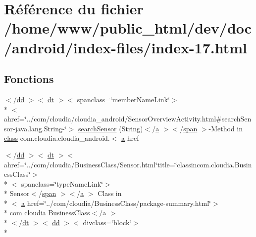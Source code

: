 \hypertarget{index-17_8html}{\section{Référence du fichier /home/www/public\-\_\-html/dev/doc/android/index-\/files/index-\/17.html}
\label{index-17_8html}
}
\subsection*{Fonctions}
\begin{DoxyCompactItemize}
\item 
$<$/\hyperlink{stylesheet_8css_a47f4718a86835a7771ec592ece845221}{dd} $>$$<$ \hyperlink{stylesheet_8css_a107565fb4039d33b041380d6e0ea1d80}{dt} $>$$<$ spanclass=\char`\"{}member\-Name\-Link\char`\"{}$>$\\*
$<$ ahref=\char`\"{}../com/cloudia/cloudia\-\_\-android/Sensor\-Overview\-Activity.\-html\#search\-Sensor-\/java.\-lang.\-String-\/\char`\"{}$>$ \hyperlink{index-17_8html_ae877ed6b9ae30d5ed6ffe780bcd142f5}{search\-Sensor} (String)$<$/\hyperlink{style_8css_a5e8981582017bb8b84c21f148345d1f7}{a} $>$$<$/\hyperlink{stylesheet_8css_a8343996ebcf16220b04e54659aac31cc}{span} $>$-\/Method in \hyperlink{_tools_8html_acf06f836132665ba8114f5a414c2403f}{class} com.\-cloudia.\-cloudia\-\_\-android.$<$ \hyperlink{style_8css_a5e8981582017bb8b84c21f148345d1f7}{a} href
\item 
$<$/\hyperlink{stylesheet_8css_a47f4718a86835a7771ec592ece845221}{dd} $>$$<$ \hyperlink{stylesheet_8css_a107565fb4039d33b041380d6e0ea1d80}{dt} $>$$<$ ahref=\char`\"{}../com/cloudia/Business\-Class/Sensor.\-html\char`\"{}title=\char`\"{}classincom.\-cloudia.\-Business\-Class\char`\"{}$>$\\*
$<$ spanclass=\char`\"{}type\-Name\-Link\char`\"{}$>$\\*
 Sensor$<$/\hyperlink{stylesheet_8css_a8343996ebcf16220b04e54659aac31cc}{span} $>$$<$/\hyperlink{style_8css_a5e8981582017bb8b84c21f148345d1f7}{a} $>$ Class in\\*
$<$ \hyperlink{style_8css_a5e8981582017bb8b84c21f148345d1f7}{a} href=\char`\"{}../com/cloudia/Business\-Class/package-\/summary.\-html\char`\"{}$>$\\*
 com cloudia Business\-Class$<$/\hyperlink{style_8css_a5e8981582017bb8b84c21f148345d1f7}{a} $>$\\*
$<$/\hyperlink{stylesheet_8css_a107565fb4039d33b041380d6e0ea1d80}{dt} $>$$<$ \hyperlink{stylesheet_8css_a47f4718a86835a7771ec592ece845221}{dd} $>$$<$ divclass=\char`\"{}block\char`\"{}$>$\\*

\end{DoxyCompactItemize}
